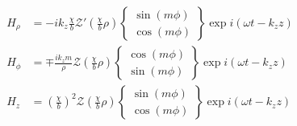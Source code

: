 \documentclass[twoside, a4paper]{article}
\begin{document}
\begin{align*}
H_\rho 	& = - i k_z \frac{\chi}{b} 
	\mathcal{Z}' \left( \frac{\chi}{b} \rho \right)
	\left\{
	\begin{array}{c}
		\sin \left( m \phi \right) \\
		\cos \left( m \phi \right)
	\end{array}
	\right\}
	\exp i \left( \omega t - k_z z \right) \\
H_\phi 	& = \mp \frac{i k_z m}{\rho} 
	\mathcal{Z} \left( \frac{\chi}{b} \rho \right)
	\left\{
	\begin{array}{c}
		\cos \left( m \phi \right) \\
		\sin \left( m \phi \right)
	\end{array}
	\right\}
	\exp i \left( \omega t - k_z z \right) \\
H_z		& = \left( \frac{\chi}{b} \right)^2
	\mathcal{Z} \left( \frac{\chi}{b} \rho \right)
	\left\{
	\begin{array}{c}
		\sin \left( m \phi \right) \\
		\cos \left( m \phi \right)
	\end{array}
	\right\}
	\exp i \left( \omega t - k_z z \right)
\end{align*}
\end{document}

